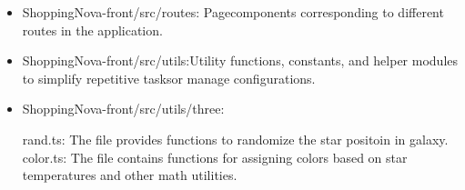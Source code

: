 \documentclass[conference]{IEEEtran}
\begin{document}
\begin{enumerate}
\begin{itemize}
\item ShoppingNova-front/src/routes: Pagecomponents corresponding to different routes in the application.

\item ShoppingNova-front/src/utils:Utility functions, constants, and helper modules to simplify repetitive tasksor manage configurations.

\item ShoppingNova-front/src/utils/three:

rand.ts: The file provides functions to randomize the star positoin in galaxy.\newline
color.ts: The file contains functions for assigning colors based on star temperatures and other math utilities.

\end{itemize}
\end{enumerate}
\end{document}
